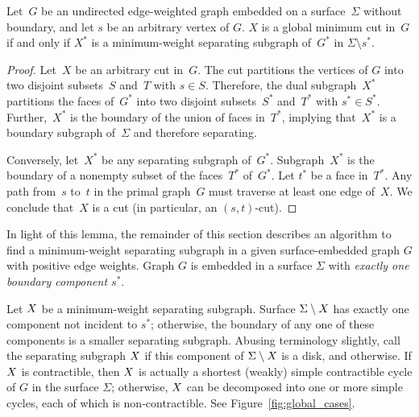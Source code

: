 \documentclass[letterpaper,review]{siamart190516}
\def\Cut{X}
\begin{document}
{\begin{lemma}
\label{lem:mincut-z2}
Let~$G$ be an undirected edge-weighted graph embedded on a surface~$\Sigma$ without boundary, and
let $s$ be an arbitrary vertex of $G$.
$\Cut$ is a global minimum cut in~$G$ if and only if $\Cut^*$ is a minimum-weight separating subgraph
of~$G^*$ in $\Sigma \setminus s^*$.
\end{lemma}

\begin{proof}
  Let~$\Cut$ be an arbitrary cut in~$G$.  The cut partitions the vertices of $G$
  into two disjoint subsets~$S$ and~$T$ with $s \in S$.
  Therefore, the dual subgraph~$\Cut^*$
  partitions the faces of~$G^*$ into two disjoint subsets~$S^*$ and~$T^*$ with $s^* \in S^*$.
  Further,~$\Cut^*$ is the boundary of the union of faces in~$T^*$, implying
  that~$\Cut^*$ is a boundary subgraph of~$\Sigma$ and therefore separating.

  Conversely, let~$\Cut^*$ be any separating subgraph of~$G^*$.
  Subgraph~$\Cut^*$ is the boundary of a nonempty subset of the faces~$T^*$
  of~$G^*$.
  Let $t^*$ be a face in~$T^*$.
  Any path from~$s$ to~$t$ in the primal
  graph~$G$ must traverse at least one edge of~$\Cut$.  We conclude that~$\Cut$ is
  a cut (in particular, an $(s,t)$-cut).
\end{proof}

In light of this lemma, the remainder of this section describes an algorithm to find a minimum-weight separating subgraph in a given surface-embedded graph $G$ with positive edge weights.
Graph $G$ is embedded in a surface $\Sigma$ with \emph{exactly one boundary component $s^*$}.

Let $X$ be a minimum-weight separating subgraph.
Surface $\Sigma \setminus X$ has exactly one component not incident to $s^*$; otherwise, the
boundary of any one of these components is a smaller separating subgraph.
Abusing terminology slightly,
call the separating subgraph $X$  if this component of $\Sigma \setminus
X$ is a disk, and  otherwise.  If $X$ is contractible, then
$X$ is actually a shortest (weakly) simple contractible cycle of $G$ in the surface $\Sigma$; otherwise, $X$ can be decomposed into one or more simple cycles, each of which is non-contractible.  See Figure~\ref{fig:global_cases}.


}
\end{document}
